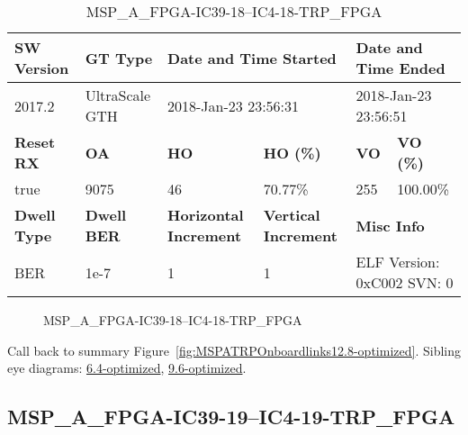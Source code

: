 \begin{table}[h]
\centering
\caption{MSP\_A\_FPGA-IC39-18--IC4-18-TRP\_FPGA}
\label{tab:MSPAFPGAIC3918IC418TRPFPGA12.8-optimized}
\begin{tabular}{@{}|l|l|l|l|l|l|@{}}
\toprule
\textbf{SW Version}                & \textbf{GT Type}   & \multicolumn{2}{l|}{\textbf{Date and Time Started}}            & \multicolumn{2}{l|}{\textbf{Date and Time Ended}}        \\ \midrule
2017.2                       & UltraScale GTH          & \multicolumn{2}{l|}{2018-Jan-23 23:56:31}                   & \multicolumn{2}{l|}{2018-Jan-23 23:56:51}               \\ \midrule
\textbf{Reset RX}                  & \textbf{OA} & \textbf{HO}   & \textbf{HO (\%)} & \textbf{VO} & \textbf{VO (\%)} \\ \midrule
true & 9075        & 46          & 70.77\%        & 255        & 100.00\%       \\ \midrule
\textbf{Dwell Type}                & \textbf{Dwell BER} & \textbf{Horizontal Increment} & \textbf{Vertical Increment}    & \multicolumn{2}{l|}{\textbf{Misc Info}}                  \\ \midrule
BER                            & 1e-7        & 1        & 1           & \multicolumn{2}{l|}{ELF Version: 0xC002 SVN: 0}                         \\ \bottomrule
\end{tabular}
\end{table}

\begin{figure}[h]
\caption{MSP\_A\_FPGA-IC39-18--IC4-18-TRP\_FPGA} \label{fig:MSPAFPGAIC3918IC418TRPFPGA12.8-optimized}
\end{figure}

Call back to summary Figure~\ref{fig:MSPATRPOnboardlinks12.8-optimized}.
Sibling eye diagrams: \hyperref[sec:MSPAFPGAIC3918IC418TRPFPGA6.4-optimized]{6.4-optimized}, \hyperref[sec:MSPAFPGAIC3918IC418TRPFPGA9.6-optimized]{9.6-optimized}.

\clearpage
\newpage


\subsection{MSP\_A\_FPGA-IC39-19--IC4-19-TRP\_FPGA}\label{sec:MSPAFPGAIC3919IC419TRPFPGA12.8-optimized}

